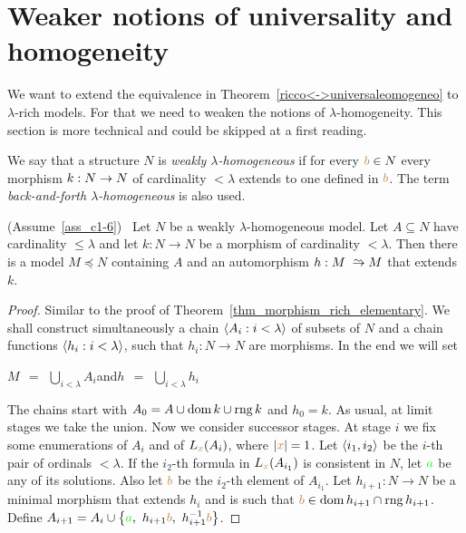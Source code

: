 \section{Weaker notions of universality and homogeneity}\label{weak}

We want to extend the equivalence in Theorem~\ref{ricco<->universaleomogeneo} to $\lambda$-rich models.
For that we need to weaken the notions of $\lambda$-homogeneity.
This section is more technical and could be skipped at a first reading.

\begin{definition}
We say that a structure $N$ is \emph{weakly $\lambda$-homogeneous\/} if for every ${\color{brown} b}\in N$ every morphism $k:N\rightarrow N$ of cardinality $<\lambda$ extends to one defined in ${\color{brown} b}$.
The term \emph{back-and-forth $\lambda$-homogeneous\/} is also used.
\end{definition}



\begin{lemma}\label{debolmenteomogeneoandirivieni}
(Assume~\ref{ass_c1-6})  \  Let $N$ be a weakly $\lambda$-ho\-mo\-ge\-ne\-ous model.
Let $A\subseteq N$ have cardinality $\le\lambda$ and let $k:N\to N$ be a morphism of cardinality $<\lambda$.
Then there is a model  $M\preceq N$ containing $A$ and an automorphism $h:M\isomap M$ that extends $k$.
\end{lemma}

\begin{proof}
Similar to the proof of Theorem~\ref{thm_morphism_rich_elementary}.
We shall construct simultaneously a chain $\langle A_i:i<\lambda\rangle$ of subsets of $N$ and a chain functions $\langle h_i:i<\lambda\rangle$, such that $h_i:N\to N$ are morphisms.
In the end we will set

\hfil $\displaystyle M\ \ =\ \ \bigcup_{i<\lambda}A_i$\hfil  and\hfil  $\displaystyle h\ \ =\ \ \bigcup_{i<\lambda}h_i$ 

The chains start with $A_0=A\cup\mathop{\rm dom} k\cup\mathop{\rm rng} k$ and $h_0=k$.
As usual, at limit stages we take the union.
Now we consider successor stages.
At stage $i$ we fix some enumerations of $A_i$ and of $L_{\color{brown} x}(A_i)$, where $|{\color{brown} x}|=1$.
Let $\langle i_1,i_2\rangle$ be the $i$-th pair of ordinals $<\lambda$.
If the $i_2$-th formula in $L_{\color{brown} x}(A_{i_1})$ is consistent in $N$, let ${\color{green} a}$ be any of its solutions.
Also let ${\color{brown} b}$ be the $i_2$-th element of $A_{i_1}$.
Let $h_{i+1}:N\to N$ be a minimal morphism that extends $h_i$ and is such that ${\color{brown} b}\in\mathop{\rm dom} h_{i+1}\cap\mathop{\rm rng} h_{i+1}$.
Define $A_{i+1}=A_i\cup\big\{{\color{green} a},\ h_{i+1}{\color{brown} b},\  h_{i+1}^{-1}{\color{brown} b}\big\}$.
\end{proof}

